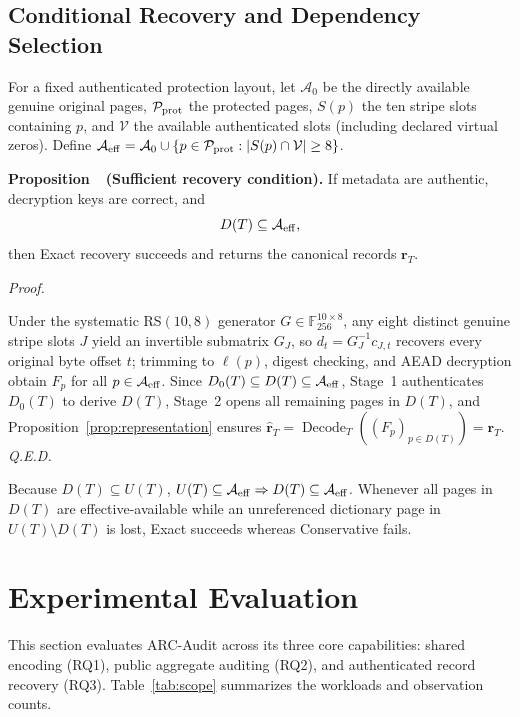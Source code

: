 \documentclass[10pt,journal]{IEEEtran}
\newcounter{proposition}
\newenvironment{proposition}[1]{%
  \refstepcounter{proposition}\par\smallskip\noindent
  \textbf{Proposition~\theproposition\ (#1). }\ignorespaces
}{\par\smallskip}
\newenvironment{claimproof}{\par\noindent\emph{Proof. }\ignorespaces
}{\hfill\textit{Q.E.D.}\par\smallskip}
\begin{document}
\subsection{Conditional Recovery and Dependency Selection}\label{sec:recovery-condition}
For a fixed authenticated protection layout, let $\mathcal A_0$ be the directly available genuine original pages, $\mathcal P_{\rm prot}$ the protected pages, $S(p)$ the ten stripe slots containing $p$, and $\mathcal V$ the available authenticated slots (including declared virtual zeros). Define $\mathcal A_{\rm eff}=\mathcal A_0\cup\{p\in\mathcal P_{\rm prot}:|S(p)\cap\mathcal V|\geq8\}$.

\begin{proposition}{Sufficient recovery condition}\label{prop:recovery}
If metadata are authentic, decryption keys are correct, and
\begin{equation}\label{eq:recovery-condition}
D(T)\subseteq\mathcal A_{\rm eff},
\end{equation}
then Exact recovery succeeds and returns the canonical records $\mathbf r_T$.
\end{proposition}
\begin{claimproof}
Under the systematic RS$(10,8)$ generator $G\in\mathbb F_{256}^{10\times8}$, any eight distinct genuine stripe slots $J$ yield an invertible submatrix $G_J$, so $d_t=G_J^{-1}c_{J,t}$ recovers every original byte offset $t$; trimming to $\ell(p)$, digest checking, and AEAD decryption obtain $F_p$ for all $p\in\mathcal A_{\rm eff}$. Since $D_0(T)\subseteq D(T)\subseteq\mathcal A_{\rm eff}$, Stage~1 authenticates $D_0(T)$ to derive $D(T)$, Stage~2 opens all remaining pages in $D(T)$, and Proposition~\ref{prop:representation} ensures $\widehat{\mathbf r}_T=\operatorname{Decode}_T((F_p)_{p\in D(T)})=\mathbf r_T$.
\end{claimproof}
Because $D(T)\subseteq U(T)$, $U(T)\subseteq\mathcal A_{\rm eff}\Rightarrow D(T)\subseteq\mathcal A_{\rm eff}$. Whenever all pages in $D(T)$ are effective-available while an unreferenced dictionary page in $U(T)\setminus D(T)$ is lost, Exact succeeds whereas Conservative fails.

\section{Experimental Evaluation}\label{sec:eval}
This section evaluates ARC-Audit across its three core capabilities: shared encoding (RQ1), public aggregate auditing (RQ2), and authenticated record recovery (RQ3). Table~\ref{tab:scope} summarizes the workloads and observation counts.
\end{document}
